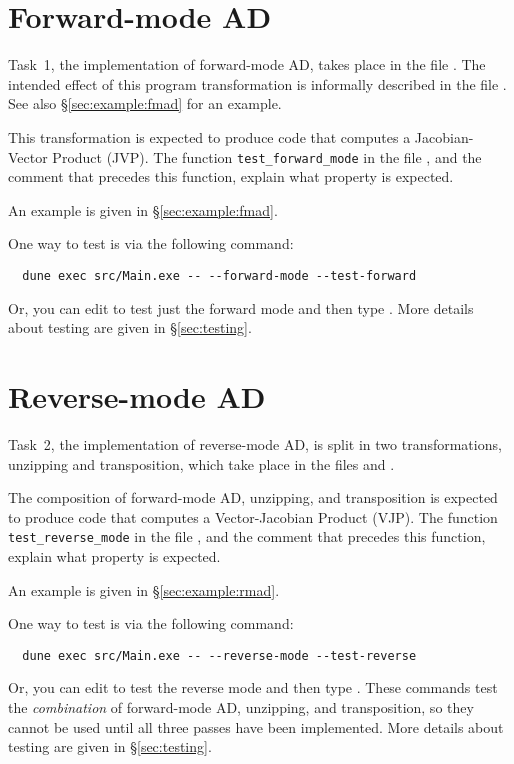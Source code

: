 \documentclass{article}
\begin{document}

\section{Forward-mode AD}

Task~1, the implementation of forward-mode AD, takes place in the file
. The intended effect of this program transformation is
informally described in the file . See also
\S\ref{sec:example:fmad} for an example.

This transformation is expected to produce code that computes a
Jacobian-Vector Product (JVP). The function \texttt{test\_forward\_mode}
in the file , and the comment that precedes this function,
explain what property is expected.

An example is given in
\S\ref{sec:example:fmad}.

One way to test is via the following command:
\begin{verbatim}
  dune exec src/Main.exe -- --forward-mode --test-forward
\end{verbatim}
Or, you can edit  to test just the forward mode
and then type .
More details about testing are given in \S\ref{sec:testing}.


\section{Reverse-mode AD}

Task~2, the implementation of reverse-mode AD, is split in two
transformations, unzipping and transposition, which take place
in the files  and .

The composition of forward-mode AD, unzipping, and transposition is expected
to produce code that computes a Vector-Jacobian Product (VJP). The function
\texttt{test\_reverse\_mode} in the file , and the comment that
precedes this function, explain what property is expected.

An example is given in
\S\ref{sec:example:rmad}.

One way to test is via the following command:
\begin{verbatim}
  dune exec src/Main.exe -- --reverse-mode --test-reverse
\end{verbatim}
Or, you can edit  to test the reverse mode
and then type .
These commands test the \emph{combination} of forward-mode AD,
unzipping, and transposition, so they cannot be used until
all three passes have been implemented.
More details about testing are given in \S\ref{sec:testing}.
\end{document}
